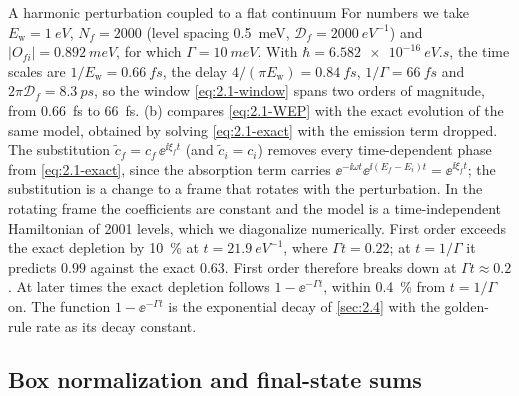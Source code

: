 \begin{workedexample}{A harmonic perturbation coupled to a flat continuum}
For numbers we take $E_{\mathrm{w}} = \SI{1}{eV}$, $N_f = 2000$ (level spacing \SI{0.5}{meV}, $\mathcal{D}_f = \SI{2000}{eV^{-1}}$) and $|O_{fi}| = \SI{0.892}{meV}$, for which $\varGamma = \SI{10}{meV}$. With $\hbar = \SI{6.582e-16}{eV.s}$, the time scales are $1/E_{\mathrm{w}} = \SI{0.66}{fs}$, the delay $4/(\pi E_{\mathrm{w}}) = \SI{0.84}{fs}$, $1/\varGamma = \SI{66}{fs}$ and $2\pi\mathcal{D}_f = \SI{8.3}{ps}$, so the window \cref{eq:2.1-window} spans two orders of magnitude, from \SI{0.66}{fs} to \SI{66}{fs}. (b) compares \cref{eq:2.1-WEP} with the exact evolution of the same model, obtained by solving \cref{eq:2.1-exact} with the emission term dropped. The substitution $\tilde c_f = c_f\,\ee^{\ii\xi_ft}$ (and $\tilde c_i = c_i$) removes every time-dependent phase from \cref{eq:2.1-exact}, since the absorption term carries $\ee^{-\ii\omega t}\ee^{\ii(E_f - E_i)t} = \ee^{\ii\xi_ft}$; the substitution is a change to a frame that rotates with the perturbation. In the rotating frame the coefficients are constant and the model is a time-independent Hamiltonian of 2001 levels, which we diagonalize numerically. First order exceeds the exact depletion by \SI{10}{\percent} at $t = \SI{21.9}{eV^{-1}}$, where $\varGamma t = 0.22$; at $t = 1/\varGamma$ it predicts $0.99$ against the exact $0.63$. First order therefore breaks down at $\varGamma t \approx 0.2$. At later times the exact depletion follows $1 - \ee^{-\varGamma t}$, within \SI{0.4}{\percent} from $t = 1/\varGamma$ on. The function $1 - \ee^{-\varGamma t}$ is the exponential decay of \cref{sec:2.4} with the golden-rule rate as its decay constant.
\end{workedexample}

\subsection{Box normalization and final-state sums}

